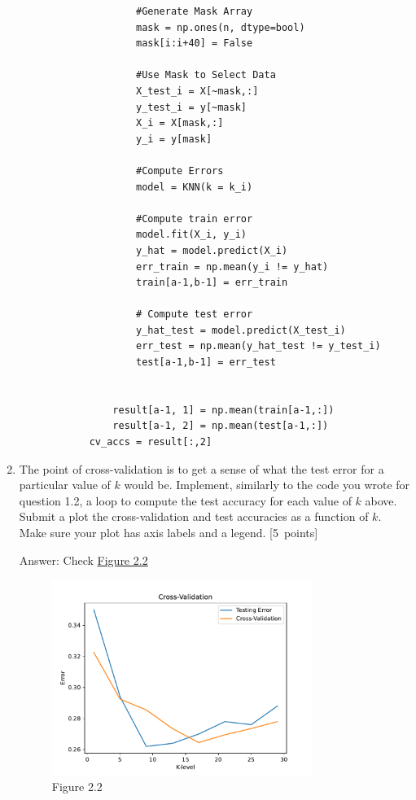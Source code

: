 \documentclass{article}
\newcommand{\blu}[1]{{\textcolor{blu}{#1}}}
\newenvironment{answer}{\par\begingroup\color{gre}Answer: }{\endgroup}
\let\ask\blu
\newcommand\pts[1]{\textcolor{pointscolour}{[#1~points]}}
\begin{document}
\begin{enumerate}
\begin{verbatim}
                    #Generate Mask Array
                    mask = np.ones(n, dtype=bool)
                    mask[i:i+40] = False

                    #Use Mask to Select Data
                    X_test_i = X[~mask,:]
                    y_test_i = y[~mask]
                    X_i = X[mask,:]
                    y_i = y[mask]

                    #Compute Errors
                    model = KNN(k = k_i)

                    #Compute train error
                    model.fit(X_i, y_i)
                    y_hat = model.predict(X_i)
                    err_train = np.mean(y_i != y_hat)
                    train[a-1,b-1] = err_train
                    
                    # Compute test error
                    y_hat_test = model.predict(X_test_i)
                    err_test = np.mean(y_hat_test != y_test_i)
                    test[a-1,b-1] = err_test


                result[a-1, 1] = np.mean(train[a-1,:])
                result[a-1, 2] = np.mean(test[a-1,:])
            cv_accs = result[:,2]

        \end{verbatim}

        

        \item The point of cross-validation is to get a sense of what the test error for a particular value of $k$ would be. Implement, similarly to the code you wrote for question 1.2, a loop to compute the test accuracy for each value of $k$ above. \ask{Submit a plot the cross-validation and test accuracies as a function of $k$.} Make sure your plot has axis labels and a legend. \pts{5}
        \begin{answer}
            Check \hyperref[fig2.2]{Figure 2.2}
        \end{answer}

        \begin{figure}[!htbp]
            \label{fig2.2}
            \centering
            \includegraphics[width = 0.8\textwidth]{figs/Cross-Validation.pdf}
            \caption{Figure 2.2}
        \end{figure}


\end{enumerate}
\end{document}
